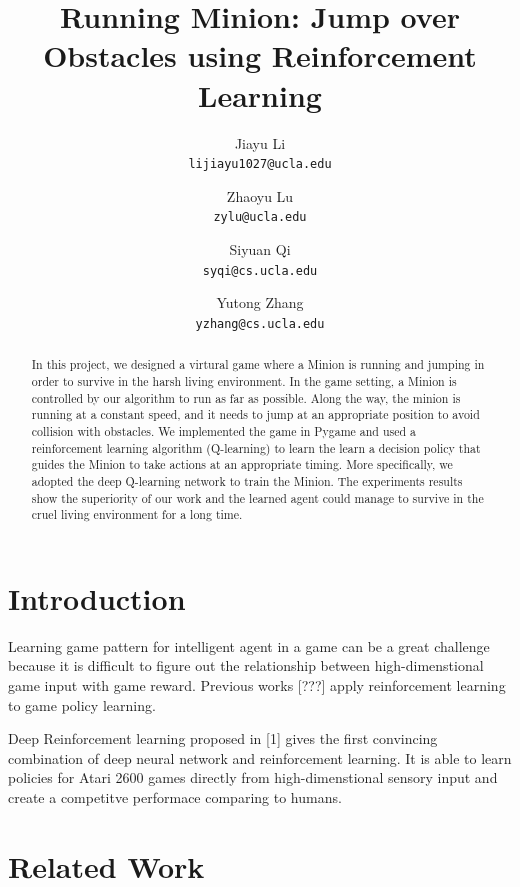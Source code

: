 \documentclass{acmsiggraph}
\title{Running Minion:  Jump over Obstacles using Reinforcement Learning}
\author{
  Jiayu Li \\
  \texttt{lijiayu1027@ucla.edu}
  \and
  Zhaoyu Lu \\
  \texttt{zylu@ucla.edu}
  \and
  Siyuan Qi \\
  \texttt{syqi@cs.ucla.edu}
  \and
  Yutong Zhang \\
  \texttt{yzhang@cs.ucla.edu}
  }
\begin{document}


\maketitle

\begin{abstract}

In this project, we designed a virtural game where a Minion is running and jumping in order to survive in the harsh living environment. In the game setting, a Minion is controlled by our algorithm to run as far as possible. Along the way, the minion is running at a constant speed, and it needs to jump at an appropriate position to avoid collision with obstacles. We implemented the game in Pygame and used a reinforcement learning algorithm (Q-learning) to learn the learn a decision policy that guides the Minion to take actions at an appropriate timing. More specifically, we adopted the deep Q-learning network to train the Minion. The experiments results show the superiority of our work and the learned agent could manage to survive in the cruel living environment for a long time.

\end{abstract}

\section{Introduction}
Learning game pattern for intelligent agent in a game can be a great challenge because it is difficult to figure out the relationship between high-dimenstional game input with game reward. Previous works [???] apply reinforcement learning to game policy learning. 

Deep Reinforcement learning proposed in [1] gives the first convincing combination of deep neural network and reinforcement learning. It is able to learn policies for Atari 2600 games directly from high-dimenstional sensory input and create a competitve performace comparing to humans.

\section{Related Work}
\end{document}
